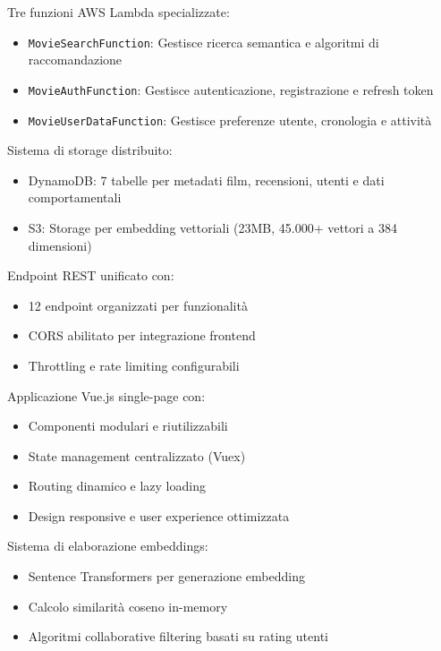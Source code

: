 \documentclass[11pt,a4paper]{article}
\begin{document}
\begin{description}[style=nextline, leftmargin=0cm, itemsep=0.5em]
  \item[Backend Serverless] Tre funzioni AWS Lambda specializzate:
    \begin{itemize}
      \item \texttt{MovieSearchFunction}: Gestisce ricerca semantica e algoritmi di raccomandazione
      \item \texttt{MovieAuthFunction}: Gestisce autenticazione, registrazione e refresh token
      \item \texttt{MovieUserDataFunction}: Gestisce preferenze utente, cronologia e attività
    \end{itemize}
  
  \item[Data Layer] Sistema di storage distribuito:
    \begin{itemize}
      \item DynamoDB: 7 tabelle per metadati film, recensioni, utenti e dati comportamentali
      \item S3: Storage per embedding vettoriali (23MB, 45.000+ vettori a 384 dimensioni)
    \end{itemize}
  
  \item[API Gateway] Endpoint REST unificato con:
    \begin{itemize}
      \item 12 endpoint organizzati per funzionalità
      \item CORS abilitato per integrazione frontend
      \item Throttling e rate limiting configurabili
    \end{itemize}
  
  \item[Frontend Web] Applicazione Vue.js single-page con:
    \begin{itemize}
      \item Componenti modulari e riutilizzabili
      \item State management centralizzato (Vuex)
      \item Routing dinamico e lazy loading
      \item Design responsive e user experience ottimizzata
    \end{itemize}
  
  \item[Machine Learning Pipeline] Sistema di elaborazione embeddings:
    \begin{itemize}
      \item Sentence Transformers per generazione embedding
      \item Calcolo similarità coseno in-memory
      \item Algoritmi collaborative filtering basati su rating utenti
    \end{itemize}
  

\end{description}
\end{document}
